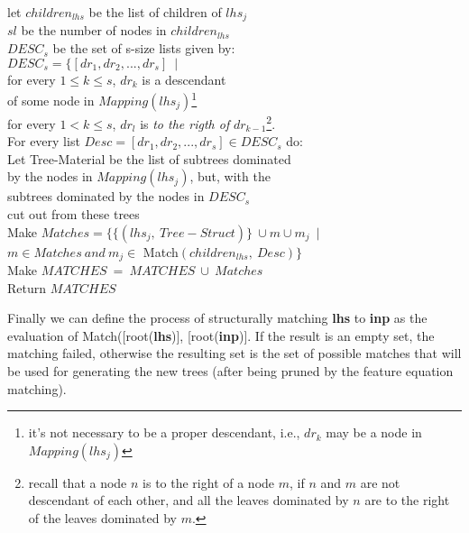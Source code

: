 \begin{tabbing}
\>\>\>\>\> let \>$children_{lhs}$ be the list of children of $lhs_j$ \\
\>\>\>\>\> \> $sl$ be the number of nodes in $children_{lhs}$ \\

\>\>\>\>\>\> $DESC_s$ be the set of s-size lists given by: \\
\>\>\>\>\>\>\>\> $DESC_s=\{[dr_1,dr_2,...,dr_s]\ \mid\ $ \\
\>\>\>\>\>\>\>\>\>\> for every $1 \leq k \leq s$, $dr_k$ is a descendant \\
\>\>\>\>\>\>\>\>\>\>\>\> of
			some node in $Mapping(lhs_j)$\footnote{it's not 
		necessary to be a proper descendant,
	        i.e., $dr_k$ may be a node in $Mapping(lhs_j)$}\\
\>\>\>\>\>\>\>\>\>\> for every $1 < k \leq s$, $dr_l$ is {\it to the rigth of}
			$dr_{k-1}$\footnote{recall that a node 
$n$ is to the right of a node $m$, if $n$ and $m$ are not descendant of each
other, and all the leaves dominated by $n$ are to the right of the leaves
dominated by $m$.}.\\

\>\>\>\>\>\> For every list $Desc=[dr_1,dr_2,...,dr_s] \in DESC_s$ do: \\

\>\>\>\>\>\>\> Let Tree-Material be the list of subtrees dominated \\
\>\>\>\>\>\>\>\>\> by the nodes in $Mapping(lhs_j)$, but, with the \\
\>\>\>\>\>\>\>\>\> subtrees dominated by the nodes in $DESC_s$ \\
\>\>\>\>\>\>\>\>\> cut out from these trees \\

\>\>\>\>\>\>\> Make $Matches=\{\{(lhs_j,\ Tree-Struct)\}\ \cup 
	m\cup m_j\ \mid$ \\
\>\>\>\>\>\>\>\>\> $m\in Matches\ and\ 
	m_j\in$ Match$(children_{lhs},\ Desc)\}$ \\ 

\>\>\> Make $MATCHES\ =\ MATCHES\ \cup\ Matches$ \\

\>\> Return $MATCHES$

\end{tabbing}

Finally we can define the process of structurally matching {\bf lhs} to
{\bf inp} as the evaluation of Match([root({\bf lhs})], [root({\bf inp})].
If the result is an empty set, the matching failed, otherwise the resulting
set is the set of possible matches that will be used for generating the
new trees (after being pruned by the feature equation matching).

